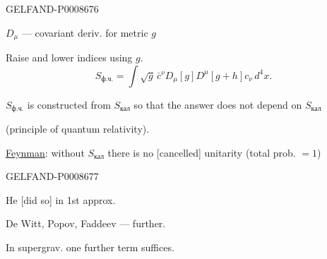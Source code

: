 \begin{GelfandAdjacentEvidence}{GELFAND-P000867}{6}


$D_\mu$ --- covariant deriv. for metric $g$

Raise and lower indices using $g$.
\begin{equation*}
S_{\text{ф.ч.}}=\int\sqrt{g}\,\bar c^{\nu}D_\mu[g]D^{\mu}[g+h]c_\nu\,d^4x. \tag{8}
\end{equation*}

$S_{\text{ф.ч.}}$ is constructed from $S_{\text{кал}}$ so that the answer does not depend on $S_{\text{кал}}$

(principle of quantum relativity).

 \underline{Feynman}: without $S_{\text{кал}}$ there is no \textcolor{orange!65!black}{[cancelled]} unitarity (total prob. $=1$)
\end{GelfandAdjacentEvidence}
\begin{GelfandAdjacentEvidence}{GELFAND-P000867}{7}


He [did so] in 1st approx.

De Witt, Popov, Faddeev --- further.

\end{GelfandAdjacentEvidence}


In supergrav. one further term suffices.


